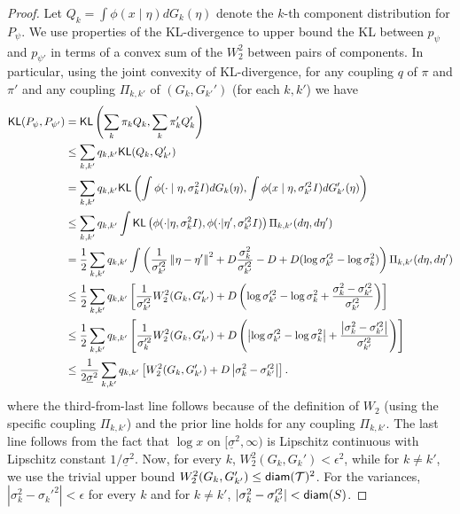 \documentclass[bj,authoryear]{imsart}
\theoremstyle{plain}
\theoremstyle{remark}
\def\cT{\mathcal{T}}
\def\diam{{\sf diam}}
\def\KL{{\sf KL}}
\def\norm#1{\left\|#1\right\|}
\begin{document}
\begin{appendix}
\begin{proof}
    Let $Q_k=\int \phi(x\mid \eta) dG_k(\eta)$ denote the $k$-th component distribution for $P_{\psi}$. We use properties of the KL-divergence to upper bound the KL between $p_{\psi}$ and $p_{\psi'}$ in terms of a convex sum of the $W_2^2$ between pairs of components. In particular, using the joint convexity of KL-divergence, for any coupling $q$ of $\pi$ and $\pi'$ and any coupling $\Pi_{k,k'}$ of $(G_k, G_{k'}')$ (for each $k,k'$) we have
    \begin{align*}
        \KL(P_{\psi}, P_{\psi'}) &= \KL\left(\sum_k \pi_k Q_k, \sum_k \pi_k' Q_{k}'\right) \\
        &\leq \sum_{k,k'} q_{k,k'} \KL(Q_k, Q_{k'}') \\
        &= \sum_{k,k'} q_{k,k'} \KL\left(\int \phi(\cdot\mid \eta,\sigma_k^2 I) dG_k(\eta), \int \phi(x\mid \eta, \sigma_{k'}'^2 I) dG_{k'}'(\eta)\right) \\
        &\leq \sum_{k,k'} q_{k,k'} \int \KL\left(\phi(\cdot|\eta,\sigma_k^2 I), \phi(\cdot|\eta',\sigma_{k'}'^2 I)\right) \Pi_{k,k'}(d\eta,d\eta') \\
        &= \frac{1}{2}\sum_{k,k'} q_{k,k'} \int \left(\frac{1}{\sigma_{k'}'^2}\norm{\eta - \eta'}^2 + D\frac{\sigma_k^2}{\sigma_{k'}'^2} - D + D(\log \sigma_{k'}'^2 - \log \sigma_k^2) \right)\Pi_{k,k'}(d\eta, d\eta') \\
        &\leq \frac{1}{2 }\sum_{k,k'} q_{k,k'} \left[\frac{1}{\sigma_{k'}'^2} W_2^2(G_k, G_{k'}') + D\left(\log \sigma_{k'}'^2 - \log \sigma_k^2 + \frac{\sigma_k^2 - \sigma_{k'}'^2}{\sigma_{k'}'^2}\right)\right]\\
        &\leq \frac{1}{2}\sum_{k,k'} q_{k,k'} \left[\frac{1}{\sigma_k'^2} W_2^2(G_k, G_{k'}') + D\left(\left|\log \sigma_{k'}'^2 - \log \sigma_k^2\right| + \frac{\left|\sigma_k^2 - \sigma_{k'}'^2\right|}{\sigma_{k'}'^2}\right)\right] \\
        &\leq \frac{1}{2 \underline{\sigma}^2}\sum_{k,k'} q_{k,k'} \left[W_2^2(G_k, G_{k'}') + D\left|\sigma_k^2 - \sigma_{k'}'^2\right|\right].
    \end{align*}
    where the third-from-last line follows because of the definition of $W_2$ (using the specific coupling $\Pi_{k,k'}$) and the prior line holds for any coupling $\Pi_{k,k'}$. The last line follows from the fact that $\log x$ on $[\underline{\sigma}^2, \infty)$ is Lipschitz continuous with Lipschitz constant $1/\underline{\sigma}^2$. Now, for every $k$, $W_2^2(G_k, G_k') <\epsilon^2$, while for $k\neq k'$, we use the trivial upper bound $W_2^2(G_k, G_{k'}') \leq \diam(\cT)^2$. For the variances, $|\sigma_k^2 - \sigma_k'^2|<\epsilon$ for every $k$ and for $k\neq k'$, $|\sigma_k^2 - \sigma_{k'}'^2| < \diam(S)$. 
    

\end{proof}
\end{appendix}
\end{document}
